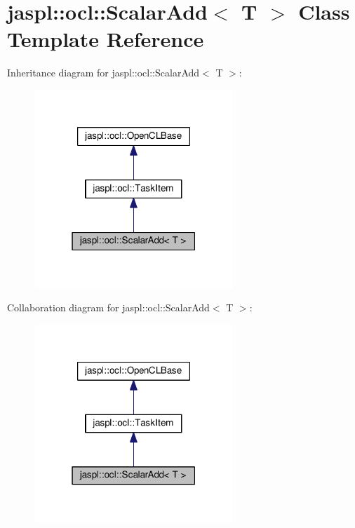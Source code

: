 \hypertarget{classjaspl_1_1ocl_1_1_scalar_add}{}\section{jaspl\+:\+:ocl\+:\+:Scalar\+Add$<$ T $>$ Class Template Reference}
\label{classjaspl_1_1ocl_1_1_scalar_add}


Inheritance diagram for jaspl\+:\+:ocl\+:\+:Scalar\+Add$<$ T $>$\+:\nopagebreak
\begin{figure}[H]
\begin{center}
\leavevmode
\includegraphics[width=211pt]{classjaspl_1_1ocl_1_1_scalar_add__inherit__graph}
\end{center}
\end{figure}


Collaboration diagram for jaspl\+:\+:ocl\+:\+:Scalar\+Add$<$ T $>$\+:\nopagebreak
\begin{figure}[H]
\begin{center}
\leavevmode
\includegraphics[width=211pt]{classjaspl_1_1ocl_1_1_scalar_add__coll__graph}
\end{center}
\end{figure}
